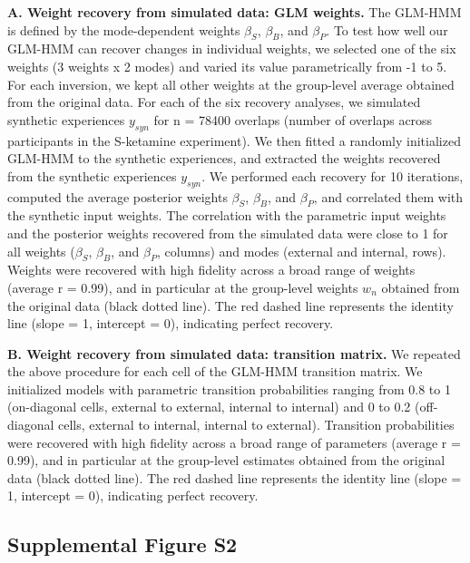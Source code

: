 \documentclass[
]{article}
\begin{document}
\textbf{A. Weight recovery from simulated data: GLM weights.} The
GLM-HMM is defined by the mode-dependent weights \(\beta_S\),
\(\beta_B\), and \(\beta_P\). To test how well our GLM-HMM can recover
changes in individual weights, we selected one of the six weights (3
weights x 2 modes) and varied its value parametrically from -1 to 5. For
each inversion, we kept all other weights at the group-level average
obtained from the original data. For each of the six recovery analyses,
we simulated synthetic experiences \(y_{syn}\) for n = 78400 overlaps
(number of overlaps across participants in the S-ketamine experiment).
We then fitted a randomly initialized GLM-HMM to the synthetic
experiences, and extracted the weights recovered from the synthetic
experiences \(y_{syn}\). We performed each recovery for 10 iterations,
computed the average posterior weights \(\beta_S\), \(\beta_B\), and
\(\beta_P\), and correlated them with the synthetic input weights. The
correlation with the parametric input weights and the posterior weights
recovered from the simulated data were close to 1 for all weights
(\(\beta_S\), \(\beta_B\), and \(\beta_P\), columns) and modes (external
and internal, rows). Weights were recovered with high fidelity across a
broad range of weights (average r = 0.99), and in particular at the
group-level weights \(w_n\) obtained from the original data (black
dotted line). The red dashed line represents the identity line (slope =
1, intercept = 0), indicating perfect recovery.

\textbf{B. Weight recovery from simulated data: transition matrix.} We
repeated the above procedure for each cell of the GLM-HMM transition
matrix. We initialized models with parametric transition probabilities
ranging from 0.8 to 1 (on-diagonal cells, external to external, internal
to internal) and 0 to 0.2 (off-diagonal cells, external to internal,
internal to external). Transition probabilities were recovered with high
fidelity across a broad range of parameters (average r = 0.99), and in
particular at the group-level estimates obtained from the original data
(black dotted line). The red dashed line represents the identity line
(slope = 1, intercept = 0), indicating perfect recovery.

\newpage

\subsection{Supplemental Figure S2}\label{supplemental-figure-s2}
\end{document}
